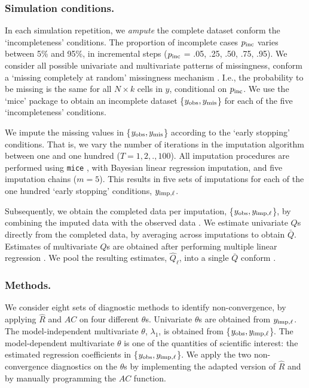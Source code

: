 \documentclass[Royal,times,sageh]{sagej}
\begin{document}
\hypertarget{simulation-conditions.}{%
\subsubsection{Simulation conditions.}\label{simulation-conditions.}}

In each simulation repetition, we \emph{ampute} the complete dataset conform the `incompleteness' conditions. The proportion of incomplete cases \(p_{\rm inc}\) varies between 5\% and 95\%, in incremental steps (\(p_{\rm inc}\) = .05, .25, .50, .75, .95). We consider all possible univariate and multivariate patterns of missingness, conform a `missing completely at random' missingness mechanism \citep[MCAR;][]{rubin87}. I.e., the probability to be missing is the same for all \(N \times k\) cells in \(y\), conditional on \(p_{\rm inc}\). We use the `mice' package \citep[function \texttt{mice::ampute()};][]{mice} to obtain an incomplete dataset \{\(y_{\rm obs}, y_{\rm mis}\)\} for each of the five `incompleteness' conditions.

We impute the missing values in \{\(y_{\rm obs}, y_{\rm mis}\)\} according to the `early stopping' conditions. That is, we vary the number of iterations in the imputation algorithm between one and one hundred (\(T = 1,2,.,100\)). All imputation procedures are performed using \texttt{mice} \citep[function \texttt{mice()};][]{mice}, with Bayesian linear regression imputation, and five imputation chains (\(m=5\)). This results in five sets of imputations for each of the one hundred `early stopping' conditions, \(y_{\rm imp, \ell}\).

Subsequently, we obtain the completed data per imputation, \{\(y_{\rm obs}, y_{\rm imp, \ell}\)\}, by combining the imputed data with the observed data \citep[function \texttt{mice::complete()};][]{mice}. We estimate univariate \(Q\)s directly from the completed data, by averaging across imputations to obtain \(\bar{Q}\). Estimates of multivariate \(Q\)s are obtained after performing multiple linear regression \citep[function \texttt{stats::lm()},][]{R}. We pool the resulting estimates, \(\hat{Q}_\ell\), into a single \(\bar{Q}\) conform \citet{vink14}.

\hypertarget{methods.}{%
\subsubsection{Methods.}\label{methods.}}

We consider eight sets of diagnostic methods to identify non-convergence, by applying \(\widehat{R}\) and \(AC\) on four different \(\theta\)s. Univariate \(\theta\)s are obtained from \(y_{\rm imp, \ell}\). The model-independent multivariate \(\theta\), \(\lambda_{1}\), is obtained from \{\(y_{\rm obs}, y_{\rm imp, \ell}\)\}. The model-dependent multivariate \(\theta\) is one of the quantities of scientific interest: the estimated regression coefficients in \{\(y_{\rm obs}, y_{\rm imp, \ell}\)\}. We apply the two non-convergence diagnostics on the \(\theta\)s by implementing the adapted version of \(\widehat{R}\) and by manually programming the \(AC\) function.
\end{document}
